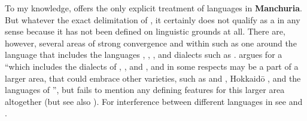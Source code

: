 To my knowledge, \cite{Janhunen1996,Janhunen1997} offers the only explicit treatment of languages in \textbf{Manchuria}. But whatever the exact delimitation of , it certainly does not qualify as a  in any sense because it has not been defined on linguistic grounds at all. There are, however, several areas of strong convergence and  within  such as one around the  language  that includes the  languages , , , and  dialects such as . \citet[72]{Gusev2015b} argues for a  “which includes the dialects of ,  ,  and , and in some respects may be a part of a larger area, that could embrace other varieties, such as  and , Hokkaid\=o ,  and the languages of ”, but fails to mention any defining features for this larger area altogether (but see also \citealt{Yamada2010}). For interference between different  languages in  see  and .


